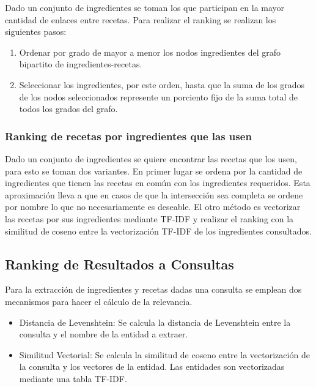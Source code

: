\documentclass[
	a4paper, %
	10pt, %
	unnumberedsections, %
	twoside, %
]{LTJournalArticle}
\begin{document}
Dado un conjunto de ingredientes se toman los que participan en la mayor cantidad de enlaces entre recetas.
Para realizar el ranking se realizan los siguientes pasos:

\begin{enumerate}
	\item Ordenar por grado de mayor a menor los nodos ingredientes del grafo bipartito de ingredientes-recetas.
	\item Seleccionar los ingredientes, por este orden, hasta que la suma de los grados de los nodos seleccionados 
	represente un porciento fijo de la suma total de todos los grados del grafo.
\end{enumerate}

\subsubsection{Ranking de recetas por ingredientes que las usen}

Dado un conjunto de ingredientes se quiere encontrar las recetas que los usen, para esto se toman dos variantes.
En primer lugar se ordena por la cantidad de ingredientes que tienen las recetas en común con los ingredientes
requeridos. Esta aproximación lleva a que en casos de que la intersección sea completa se ordene por nombre lo que
no necesariamente es deseable. El otro método es vectorizar las recetas por sus ingredientes mediante TF-IDF y
realizar el ranking con la similitud de coseno entre la vectorización TF-IDF de los ingredientes consultados.

\subsection{Ranking de Resultados a Consultas}
\label{subsec:rank_query}

Para la extracción de ingredientes y recetas dadas una consulta se emplean dos mecanismos para hacer el cálculo
de la relevancia.

\begin{itemize}
	\item Distancia de Levenshtein: Se calcula la distancia de Levenshtein entre la consulta y el nombre de la 
	entidad a extraer.
	\item Similitud Vectorial: Se calcula la similitud de coseno entre la vectorización de la consulta y los
	vectores de la entidad. Las entidades son vectorizadas mediante una tabla TF-IDF. 
\end{itemize}
\end{document}
